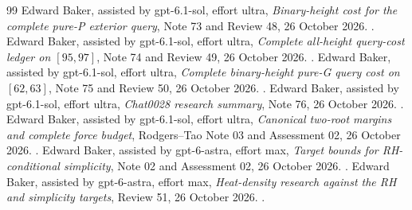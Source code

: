 \begin{thebibliography}{99}
 Edward Baker, assisted by gpt-6.1-sol, effort ultra,
\emph{Binary-height cost for the complete pure-P exterior query},
Note 73 and Review 48, 26 October 2026.
.
 Edward Baker, assisted by gpt-6.1-sol, effort ultra,
\emph{Complete all-height query-cost ledger on $[95,97]$},
Note 74 and Review 49, 26 October 2026.
.
 Edward Baker, assisted by gpt-6.1-sol, effort ultra,
\emph{Complete binary-height pure-G query cost on $[62,63]$},
Note 75 and Review 50, 26 October 2026.
.
 Edward Baker, assisted by gpt-6.1-sol, effort ultra,
\emph{Chat0028 research summary}, Note 76, 26 October 2026.
.
 Edward Baker, assisted by gpt-6.1-sol, effort ultra,
\emph{Canonical two-root margins and complete force budget},
Rodgers--Tao Note 03 and Assessment 02, 26 October 2026.
.
 Edward Baker, assisted by gpt-6-astra, effort max,
\emph{Target bounds for RH-conditional simplicity}, Note 02 and
Assessment 02, 26 October 2026.
.
 Edward Baker, assisted by gpt-6-astra, effort max,
\emph{Heat-density research against the RH and simplicity targets},
Review 51, 26 October 2026.
.
\end{thebibliography}
